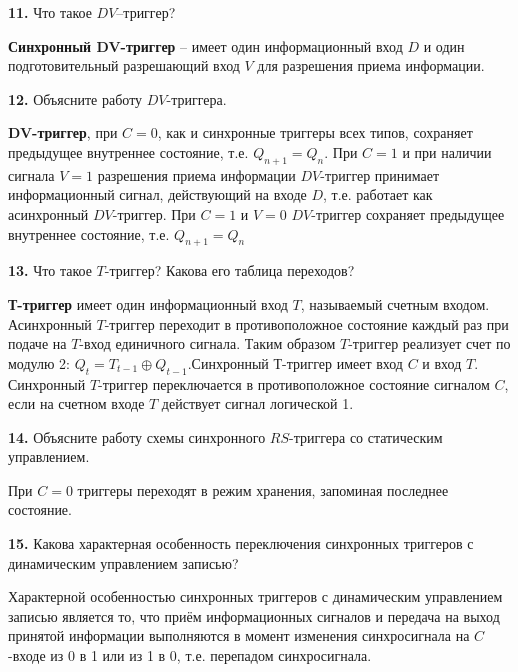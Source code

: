 \documentclass[a4paper,12pt]{article}
\begin{document}
\noindent\textbf{11.} Что такое $DV$–триггер? \newline

\noindent\textbf{Синхронный DV-триггер} -- имеет один информационный вход $D$ и один подготовительный разрешающий вход $V$ для разрешения приема информации.\newline

\noindent\textbf{12.} Объясните работу $DV$-триггера. \newline

\noindent\textbf{DV-триггер}, при $C = 0$, как и синхронные триггеры всех типов, сохраняет предыдущее внутреннее состояние, т.е. $Q_{n + 1} = Q_{n}$. При $C = 1$ и при наличии сигнала $V = 1$ разрешения приема информации $DV$-триггер принимает информационный сигнал, действующий на входе $D$, т.е. работает как асинхронный $DV$-триггер. При $C = 1$ и $V = 0$ $DV$-триггер сохраняет предыдущее внутреннее состояние, т.е. $Q_{n + 1} = Q_{n}$\newline

\noindent\textbf{13.} Что такое $T$-триггер? Какова его таблица переходов? \newline

\noindent\textbf{Т-триггер} имеет один информационный вход $T$, называемый счетным входом. Асинхронный $T$-триггер переходит в противоположное состояние каждый раз при подаче на $T$-вход единичного сигнала. Таким образом $T$-триггер реализует счет по модулю 2: $Q_{t} = T_{t - 1} \oplus Q_{t - 1}$.Синхронный $Т$-триггер имеет вход $C$ и вход $T$. Синхронный $T$-триггер переключается в противоположное состояние сигналом $C$, если на счетном входе $T$ действует сигнал логической 1.\newline

\noindent\textbf{14.} Объясните работу схемы синхронного $RS$-триггера со статическим управлением. \newline

\noindent При $C = 0$ триггеры переходят в режим хранения, запоминая последнее состояние.\newline

\noindent\textbf{15.} Какова характерная особенность переключения синхронных триггеров с динамическим управлением записью? \newline

\noindent Характерной особенностью синхронных триггеров с динамическим управлением записью является то, что приём информационных сигналов и передача на выход принятой информации выполняются в момент изменения синхросигнала на $C$-входе из 0 в 1 или из 1 в 0, т.е. перепадом синхросигнала.\newline
\end{document}
